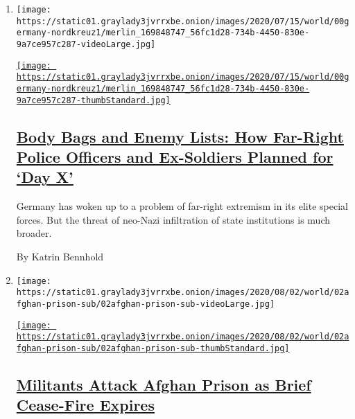 \begin{enumerate}
\def\labelenumi{\arabic{enumi}.}
\item
  \texttt{[image: https://static01.graylady3jvrrxbe.onion/images/2020/07/15/world/00germany-nordkreuz1/merlin\_169848747\_56fc1d28-734b-4450-830e-9a7ce957c287-videoLarge.jpg]}

  \href{/2020/08/01/world/europe/germany-nazi-infiltration.html}{\texttt{[image: https://static01.graylady3jvrrxbe.onion/images/2020/07/15/world/00germany-nordkreuz1/merlin\_169848747\_56fc1d28-734b-4450-830e-9a7ce957c287-thumbStandard.jpg]}}

  \hypertarget{body-bags-and-enemy-lists-how-far-right-police-officers-and-ex-soldiers-planned-for-day-x}{%
  \subsection{\texorpdfstring{\href{/2020/08/01/world/europe/germany-nazi-infiltration.html}{Body
  Bags and Enemy Lists: How Far-Right Police Officers and Ex-Soldiers
  Planned for `Day
  X'}}{Body Bags and Enemy Lists: How Far-Right Police Officers and Ex-Soldiers Planned for `Day X'}}\label{body-bags-and-enemy-lists-how-far-right-police-officers-and-ex-soldiers-planned-for-day-x}}

  Germany has woken up to a problem of far-right extremism in its elite
  special forces. But the threat of neo-Nazi infiltration of state
  institutions is much broader.

  By Katrin Bennhold
\item
  \texttt{[image: https://static01.graylady3jvrrxbe.onion/images/2020/08/02/world/02afghan-prison-sub/02afghan-prison-sub-videoLarge.jpg]}

  \href{/2020/08/02/world/asia/afghan-prison-attack-prisoners.html}{\texttt{[image: https://static01.graylady3jvrrxbe.onion/images/2020/08/02/world/02afghan-prison-sub/02afghan-prison-sub-thumbStandard.jpg]}}

  \hypertarget{militants-attack-afghan-prison-as-brief-cease-fire-expires}{%
  \subsection{\texorpdfstring{\href{/2020/08/02/world/asia/afghan-prison-attack-prisoners.html}{Militants
  Attack Afghan Prison as Brief Cease-Fire
  Expires}}{Militants Attack Afghan Prison as Brief Cease-Fire Expires}}\label{militants-attack-afghan-prison-as-brief-cease-fire-expires}}


\end{enumerate}
